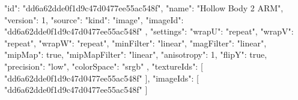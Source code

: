 {
  "id": "dd6a62dde0f1d9c47d0477ee55ac548f",
  "name": "Hollow Body 2 ARM",
  "version": 1,
  "source": {
    "kind": "image",
    "imageId": "dd6a62dde0f1d9c47d0477ee55ac548f"
  },
  "settings": {
    "wrapU": "repeat",
    "wrapV": "repeat",
    "wrapW": "repeat",
    "minFilter": "linear",
    "magFilter": "linear",
    "mipMap": true,
    "mipMapFilter": "linear",
    "anisotropy": 1,
    "flipY": true,
    "precision": "low",
    "colorSpace": "srgb"
  },
  "textureIds": [
    "dd6a62dde0f1d9c47d0477ee55ac548f"
  ],
  "imageIds": [
    "dd6a62dde0f1d9c47d0477ee55ac548f"
  ]
}

